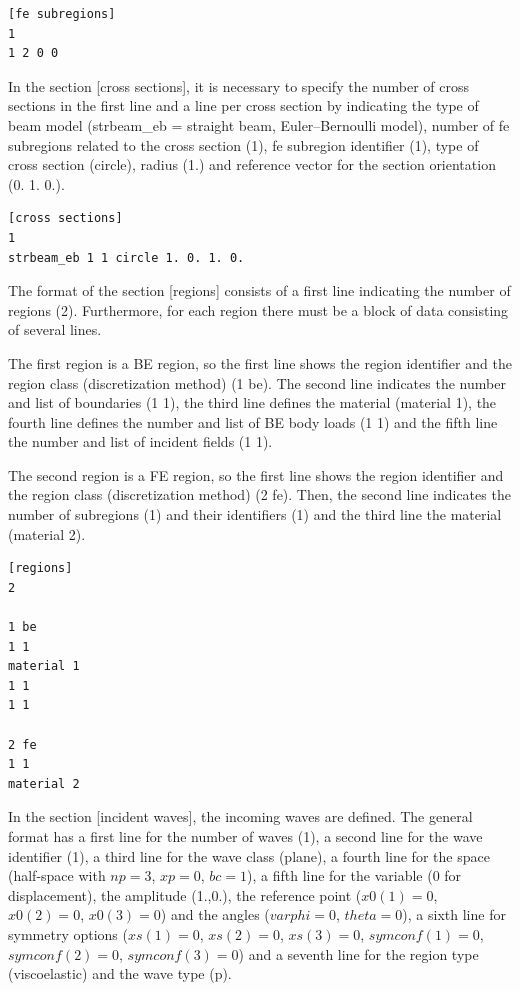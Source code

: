 \documentclass[a4]{article}
\begin{document}
\begin{Verbatim}
[fe subregions]
1
1 2 0 0
\end{Verbatim}

In the section [cross sections], it is necessary to specify the number of cross sections in the first line and a line per cross section by indicating the type of beam model (strbeam\_eb = straight beam, Euler–Bernoulli model), number of fe subregions related to the cross section (1), fe subregion identifier (1), type of cross section (circle), radius (1.) and reference vector for the section orientation (0. 1. 0.).

\begin{Verbatim}
[cross sections]
1
strbeam_eb 1 1 circle 1. 0. 1. 0.
\end{Verbatim}

The format of the section [regions] consists of a first line indicating the number of regions (2). Furthermore, for each region there must be a block of data consisting of several lines. 

The first region is a BE region, so the first line shows the region identifier and the region class (discretization method) (1 be). The second line indicates the number and list of boundaries (1 1), the third line defines the material (material 1), the fourth line defines the number and list of BE body loads (1 1) and the fifth line the number and list of incident fields (1 1).

The second region is a FE region, so the first line shows the region identifier and the region class (discretization method) (2 fe). Then, the second line indicates the number of subregions (1) and their identifiers (1) and the third line the material (material 2). 

\begin{Verbatim}	
[regions]
2

1 be
1 1
material 1
1 1
1 1

2 fe
1 1
material 2
\end{Verbatim}

In the section [incident waves], the incoming waves are defined. The general format has a first line for the number of waves (1), a second line for the wave identifier (1), a third line for the wave class (plane), a fourth line for the space (half-space with $np = 3$, $xp = 0$, $bc = 1$), a fifth line for the variable (0 for displacement), the amplitude (1.,0.), the reference point ($ x0(1) = 0 $, $ x0(2) = 0 $, $ x0(3) = 0 $) and the angles ($ varphi = 0 $, $ theta = 0 $), a sixth line for symmetry options ($ xs(1) = 0 $, $ xs(2) = 0 $, $ xs(3) = 0 $, $ symconf(1) = 0 $, $ symconf(2) = 0 $, $ symconf(3) = 0 $) and a seventh line for the region type (viscoelastic) and the wave type (p).
\end{document}
